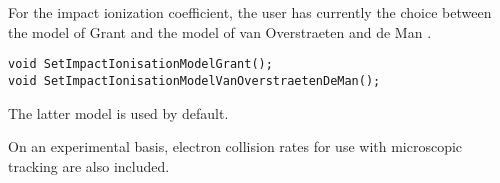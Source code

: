For the impact ionization coefficient, the user has currently the choice 
between the model of Grant \cite{Grant1973} and the model of 
van Overstraeten and de Man \cite{VanOverstraeten1970}.
\begin{lstlisting}
void SetImpactIonisationModelGrant();
void SetImpactIonisationModelVanOverstraetenDeMan();
\end{lstlisting}
The latter model is used by default.

On an experimental basis, electron collision rates for use with microscopic tracking 
are also included. 
